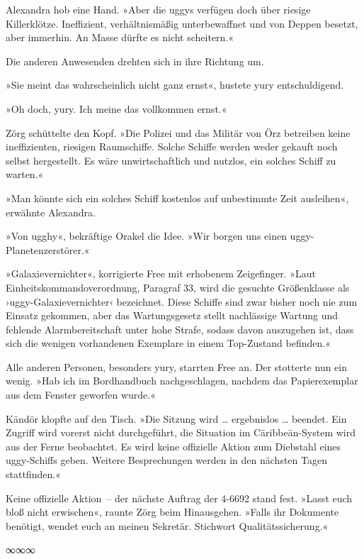 Alexandra hob eine Hand. »Aber die uggys verfügen doch über riesige Killerklötze. Ineffizient, verhältnismäßig unterbewaffnet und von Deppen besetzt, aber immerhin. An Masse dürfte es nicht scheitern.«

Die anderen Anwesenden drehten sich in ihre Richtung um.

»Sie meint das wahrscheinlich nicht ganz ernst«, hustete yury entschuldigend.

»Oh doch, yury. Ich meine das vollkommen ernst.«

Zörg schüttelte den Kopf. »Die Polizei und das Militär von Örz betreiben keine ineffizienten, riesigen Raumschiffe. Solche Schiffe werden weder gekauft noch selbst hergestellt. Es wäre unwirtschaftlich und nutzlos, ein solches Schiff zu warten.«

»Man könnte sich ein solches Schiff kostenlos auf unbestimmte Zeit ausleihen«, erwähnte Alexandra.

»Von ugghy«, bekräftige Orakel die Idee. »Wir borgen uns einen uggy-Planetenzerstörer.«

»Galaxievernichter«, korrigierte Free mit erhobenem Zeigefinger. »Laut Einheitskommandoverordnung, Paragraf 33, wird die gesuchte Größenklasse als ›uggy-Galaxievernichter‹ bezeichnet. Diese Schiffe sind zwar bisher noch nie zum Einsatz gekommen, aber das Wartungsgesetz stellt nachlässige Wartung und fehlende Alarmbereitschaft unter hohe Strafe, sodass davon auszugehen ist, dass sich die wenigen vorhandenen Exemplare in einem Top-Zustand befinden.«

Alle anderen Personen, besonders yury, starrten Free an. Der stotterte nun ein wenig. »Hab ich im Bordhandbuch nachgeschlagen, nachdem das Papierexemplar aus dem Fenster geworfen wurde.«

Kändör klopfte auf den Tisch. »Die Sitzung wird … ergebnislos … beendet. Ein Zugriff wird vorerst nicht durchgeführt, die Situation im Cäribbeän-System wird aus der Ferne beobachtet. Es wird keine offizielle Aktion zum Diebstahl eines uggy-Schiffs geben. Weitere Besprechungen werden in den nächsten Tagen stattfinden.«

Keine offizielle Aktion~– der nächste Auftrag der 4-6692 stand fest. »Lasst euch bloß nicht erwischen«, raunte Zörg beim Hinausgehen. »Falls ihr Dokumente benötigt, wendet euch an meinen Sekretär. Stichwort Qualitätssicherung.«

\begin{center}
∞∞∞
\end{center}

